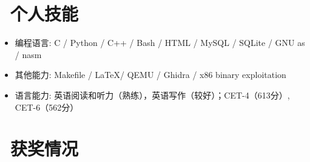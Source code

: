 \documentclass{resume}
\begin{document}
\section{\faCogs\ 个人技能}
\begin{itemize}[parsep=0.5ex]
  \item 编程语言: C / Python / C++ / Bash / HTML / MySQL / SQLite / GNU as / nasm 
  \item 其他能力: Makefile / \LaTeX / QEMU / Ghidra / x86 binary exploitation
  \item 语言能力: 英语阅读和听力（熟练），英语写作（较好）；CET-4（613分）, CET-6（562分）
\end{itemize}

\section{\faTrophy\ 获奖情况}

%
%
\end{document}
